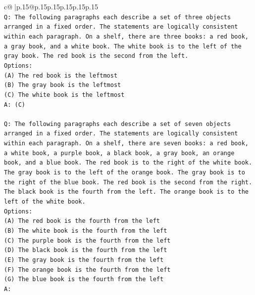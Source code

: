 \documentclass{article}
\begin{document}
{\begin{supertabular}{c@{$\;$}|p{.15\linewidth}@{}p{.15\linewidth}p{.15\linewidth}p{.15\linewidth}p{.15\linewidth}p{.15\linewidth}}
{{{\\ 
\texttt{Q: The following paragraphs each describe a set of three objects arranged in a fixed order. The statements are logically consistent within each paragraph. On a shelf, there are three books: a red book, a gray book, and a white book. The white book is to the left of the gray book. The red book is the second from the left.} \\
\texttt{Options:} \\
\texttt{(A) The red book is the leftmost} \\
\texttt{(B) The gray book is the leftmost} \\
\texttt{(C) The white book is the leftmost} \\
\texttt{A: (C)} \\
\\ 
\texttt{Q: The following paragraphs each describe a set of seven objects arranged in a fixed order. The statements are logically consistent within each paragraph. On a shelf, there are seven books: a red book, a white book, a purple book, a black book, a gray book, an orange book, and a blue book. The red book is to the right of the white book. The gray book is to the left of the orange book. The gray book is to the right of the blue book. The red book is the second from the right. The black book is the fourth from the left. The orange book is to the left of the white book.} \\
\texttt{Options:} \\
\texttt{(A) The red book is the fourth from the left} \\
\texttt{(B) The white book is the fourth from the left} \\
\texttt{(C) The purple book is the fourth from the left} \\
\texttt{(D) The black book is the fourth from the left} \\
\texttt{(E) The gray book is the fourth from the left} \\
\texttt{(F) The orange book is the fourth from the left} \\
\texttt{(G) The blue book is the fourth from the left} \\
\texttt{A:} \\
            }
        }
    }
     \\ \\


\end{supertabular}}
\end{document}

